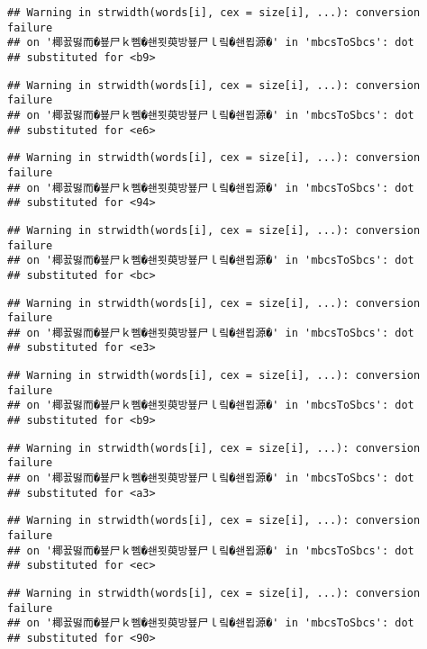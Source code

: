 \documentclass[]{article}
\begin{document}
\begin{verbatim}
## Warning in strwidth(words[i], cex = size[i], ...): conversion failure
## on '椰꾨떯而�뵾尸ｋ뻼�쇈묏萸방뵾尸ｌ맄�쇈묍源�' in 'mbcsToSbcs': dot
## substituted for <b9>
\end{verbatim}

\begin{verbatim}
## Warning in strwidth(words[i], cex = size[i], ...): conversion failure
## on '椰꾨떯而�뵾尸ｋ뻼�쇈묏萸방뵾尸ｌ맄�쇈묍源�' in 'mbcsToSbcs': dot
## substituted for <e6>
\end{verbatim}

\begin{verbatim}
## Warning in strwidth(words[i], cex = size[i], ...): conversion failure
## on '椰꾨떯而�뵾尸ｋ뻼�쇈묏萸방뵾尸ｌ맄�쇈묍源�' in 'mbcsToSbcs': dot
## substituted for <94>
\end{verbatim}

\begin{verbatim}
## Warning in strwidth(words[i], cex = size[i], ...): conversion failure
## on '椰꾨떯而�뵾尸ｋ뻼�쇈묏萸방뵾尸ｌ맄�쇈묍源�' in 'mbcsToSbcs': dot
## substituted for <bc>
\end{verbatim}

\begin{verbatim}
## Warning in strwidth(words[i], cex = size[i], ...): conversion failure
## on '椰꾨떯而�뵾尸ｋ뻼�쇈묏萸방뵾尸ｌ맄�쇈묍源�' in 'mbcsToSbcs': dot
## substituted for <e3>
\end{verbatim}

\begin{verbatim}
## Warning in strwidth(words[i], cex = size[i], ...): conversion failure
## on '椰꾨떯而�뵾尸ｋ뻼�쇈묏萸방뵾尸ｌ맄�쇈묍源�' in 'mbcsToSbcs': dot
## substituted for <b9>
\end{verbatim}

\begin{verbatim}
## Warning in strwidth(words[i], cex = size[i], ...): conversion failure
## on '椰꾨떯而�뵾尸ｋ뻼�쇈묏萸방뵾尸ｌ맄�쇈묍源�' in 'mbcsToSbcs': dot
## substituted for <a3>
\end{verbatim}

\begin{verbatim}
## Warning in strwidth(words[i], cex = size[i], ...): conversion failure
## on '椰꾨떯而�뵾尸ｋ뻼�쇈묏萸방뵾尸ｌ맄�쇈묍源�' in 'mbcsToSbcs': dot
## substituted for <ec>
\end{verbatim}

\begin{verbatim}
## Warning in strwidth(words[i], cex = size[i], ...): conversion failure
## on '椰꾨떯而�뵾尸ｋ뻼�쇈묏萸방뵾尸ｌ맄�쇈묍源�' in 'mbcsToSbcs': dot
## substituted for <90>
\end{verbatim}
\end{document}
